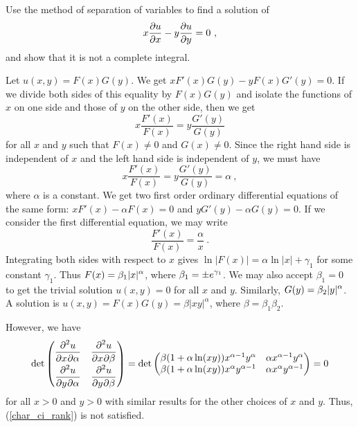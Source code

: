 \begin{egg}
Use the method of separation of variables to find a solution of
\[
x\pdydx{u}{x} - y\pdydx{u}{y} = 0 \ ,
\]
and show that it is not a complete integral.

Let $u(x,y) = F(x)G(y)$.  We get $xF'(x) G(y) - y F(x) G'(y) = 0$.  If we
divide both sides of this equality by $F(x)G(y)$ and isolate the
functions of $x$ on one side and those of $y$ on the other side, then we
get
\[
x\frac{F'(x)}{F(x)} = y\frac{G'(y)}{G(y)}
\]
for all $x$ and $y$ such that $F(x) \neq 0$ and $G(x) \neq 0$.  Since
the right hand side is independent of $x$ and the left hand side is
independent of $y$, we must have
\[
x \frac{F'(x)}{F(x)} = y \frac{G'(y)}{G(y)} = \alpha \ ,
\]
where $\alpha$ is a constant.  We get two first order ordinary
differential equations of the same form:
$x F'(x) - \alpha F(x) = 0$ and $y G'(y) - \alpha G(y) = 0$.
If we consider the first differential equation, we may write
\[
\frac{F'(x)}{F(x)} = \frac{\alpha}{x} \ .
\]
Integrating both sides with respect to $x$ gives
$\ln|F(x)| = \alpha \ln|x| + \gamma_1$
for some constant $\gamma_1$.  Thus
$\DS F(x) = \beta_1 |x|^\alpha$, where
$\DS \beta_1 = \pm e^{\gamma_1}$.  We may also accept
$\beta_1 = 0$ to get
the trivial solution $u(x,y)=0$ for all $x$ and $y$.  Similarly,
$\DS G(y) = \beta_2 |y|^\alpha$.   A solution is
$u(x,y) = F(x)G(y) = \beta |xy|^{\alpha}$, where
$\beta = \beta_1 \beta_2$.

However, we have
\[
\det
\begin{pmatrix}
\DS \pdydxnm{u}{x}{\alpha}{2}{}{} &
\DS \pdydxnm{u}{x}{\beta}{2}{}{} \\[0.7em]
\DS \pdydxnm{u}{y}{\alpha}{2}{}{} &
\DS \pdydxnm{u}{y}{\beta}{2}{}{}
\end{pmatrix}
= \det
\begin{pmatrix}
\beta (1+\alpha\ln(x y)) x^{\alpha-1}y^\alpha &
\alpha x^{\alpha-1}y^\alpha \\
\beta (1+\alpha\ln(x y)) x^\alpha y^{\alpha-1} &
\alpha x^\alpha y^{\alpha-1}
\end{pmatrix} = 0
\]
for all $x > 0$ and $y > 0$ with similar results for the other
choices of $x$ and $y$.   Thus, (\ref{char_ci_rank}) is not
satisfied.
\end{egg}

